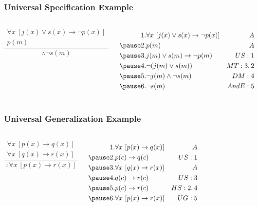 \documentclass[dvipsnames]{beamer}
\begin{document}
\begin{frame}
  \frametitle{Universal Specification Example}

  \begin{example}
    \begin{columns}
      \[
      \frac
        {
          \begin{array}{c}
            \forall x~[j(x) \vee s(x) \rightarrow \neg p(x)]\\
            p(m)
          \end{array}
        }
        {
          \therefore \neg s(m)
        }
      \]

      \pause
      \begin{eqnarray*}
        1. & \forall x~[j(x) \vee s(x) \rightarrow \neg p(x)] & A\\\pause
        2. & p(m)                                             & A\\\pause
        3. & j(m) \vee s(m) \rightarrow \neg p(m)             & US:1\\\pause
        4. & \neg (j(m) \vee s(m))                            & MT:3,2\\\pause
        5. & \neg j(m) \wedge \neg s(m)                       & DM:4\\\pause
        6. & \neg s(m)                                        & AndE:5
      \end{eqnarray*}
    \end{columns}
  \end{example}
\end{frame}

\begin{frame}
  \frametitle{Universal Generalization Example}

  \begin{example}
    \begin{columns}
      \[
      \frac
        {
          \begin{array}{c}
            \forall x~[p(x) \rightarrow q(x)]\\
            \forall x~[q(x) \rightarrow r(x)]
          \end{array}
        }
        {
          \therefore \forall x~[p(x) \rightarrow r(x)]
        }
      \]

      \pause
      \begin{eqnarray*}
        1. & \forall x~[p(x) \rightarrow q(x)] & A\\\pause
        2. & p(c) \rightarrow q(c)             & US:1\\\pause
        3. & \forall x~[q(x) \rightarrow r(x)] & A\\\pause
        4. & q(c) \rightarrow r(c)             & US:3\\\pause
        5. & p(c) \rightarrow r(c)             & HS:2,4\\\pause
        6. & \forall x~[p(x) \rightarrow r(x)] & UG:5
      \end{eqnarray*}
    \end{columns}
  \end{example}
\end{frame}
\end{document}
